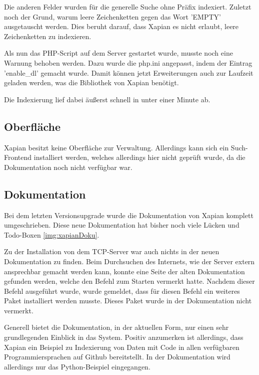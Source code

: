 Die anderen Felder wurden für die generelle Suche ohne Präfix indexiert. Zuletzt noch der Grund, warum leere Zeichenketten gegen das Wort 'EMPTY' ausgetauscht werden. Dies beruht darauf, dass Xapian es nicht erlaubt, leere Zeichenketten zu indexieren.

Als nun das PHP-Script auf dem Server gestartet wurde, musste noch eine Warnung behoben werden. Dazu wurde die php.ini angepasst, indem der Eintrag 'enable\_dl' gemacht wurde. Damit können jetzt Erweiterungen auch zur Laufzeit geladen werden, was die Bibliothek von Xapian benötigt.

Die Indexierung lief dabei äußerst schnell in unter einer Minute ab.

\subsection{Oberfläche}

Xapian besitzt keine Oberfläche zur Verwaltung. Allerdings kann sich ein Such-Frontend installiert werden, welches allerdings hier nicht geprüft wurde, da die Dokumentation noch nicht verfügbar war.

\subsection{Dokumentation}

Bei dem letzten Versionsupgrade wurde die Dokumentation von Xapian komplett umgeschrieben. Diese neue Dokumentation hat bisher noch viele Lücken und Todo-Boxen \ref{img:xapianDoku}.

Zu der Installation von dem TCP-Server war auch nichts in der neuen Dokumentation zu finden. Beim Durchsuchen des Internets, wie der Server extern ansprechbar gemacht werden kann, konnte eine Seite der alten Dokumentation gefunden werden, welche den Befehl zum Starten vermerkt hatte. Nachdem dieser Befehl ausgeführt wurde, wurde gemeldet, dass für diesen Befehl ein weiteres Paket installiert werden musste. Dieses Paket wurde in der Dokumentation nicht vermerkt. 

Generell bietet die Dokumentation, in der aktuellen Form, nur einen sehr grundlegenden Einblick in das System. Positiv anzumerken ist allerdings, dass Xapian ein Beispiel zu Indexierung von Daten mit Code in allen verfügbaren Programmiersprachen auf Github bereitstellt. In der Dokumentation wird allerdings nur das Python-Beispiel eingegangen.

